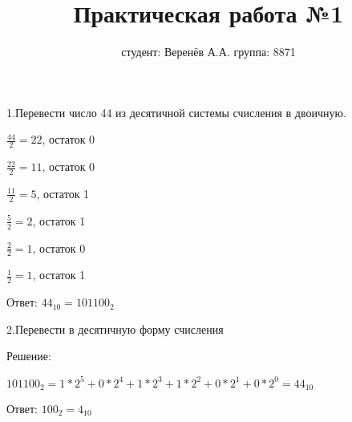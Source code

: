 \documentclass[a4paper,11pt]{article}
\title{Практическая работа №1}
\author{студент: Веренёв А.А. группа: 8871}
\begin{document}
\maketitle
1.Перевести число 44 из десятичной системы счисления в двоичную.

$\frac{44}{2}=22$, остаток 0

$\frac{22}{2}=11$, остаток 0

$\frac{11}{2}=5$, остаток 1

$\frac{5}{2}=2$, остаток 1

$\frac{2}{2}=1$, остаток 0

$\frac{1}{2}=1$, остаток 1

Ответ: $44_{10}=101100_2$

2.Перевести в десятичную форму счисления

Решение:


$101100_2=1*2^5+0*2^4+1*2^3+1*2^2+0*2^1+0*2^0=44_{10}$

Ответ: $100_2=4_{10}$
\end{document}
